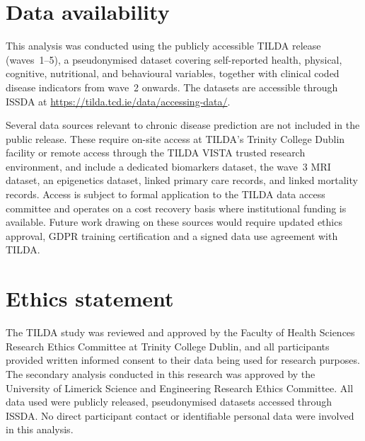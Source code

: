 \section{Data availability} 
This analysis was conducted using the publicly accessible \gls{TILDA} release (waves~1--5), a pseudonymised dataset covering self-reported health, physical, cognitive, nutritional, and behavioural variables, together with clinical coded disease indicators from wave~2 onwards. The datasets are accessible through \gls{ISSDA} at \url{https://tilda.tcd.ie/data/accessing-data/}.

Several data sources relevant to chronic disease prediction are not included in the public release. These require on-site access at \gls{TILDA}'s Trinity College Dublin facility or remote access through the \gls{TILDA} VISTA trusted research environment, and include a dedicated biomarkers dataset, the wave~3 \gls{MRI} dataset, an epigenetics dataset, linked primary care records, and linked mortality records. Access is subject to formal application to the \gls{TILDA} data access committee and operates on a cost recovery basis where institutional funding is available. Future work drawing on these sources would require updated ethics approval, \gls{GDPR} training certification and a signed data use agreement with \gls{TILDA}.

\section{Ethics statement}  
The \gls{TILDA} study was reviewed and approved by the Faculty of Health Sciences Research Ethics Committee at Trinity College Dublin, and all participants provided written informed consent to their data being used for research purposes. The secondary analysis conducted in this research was approved by the University of Limerick Science and Engineering Research Ethics Committee. All data used were publicly released, pseudonymised datasets accessed through \gls{ISSDA}. No direct participant contact or identifiable personal data were involved in this analysis.

